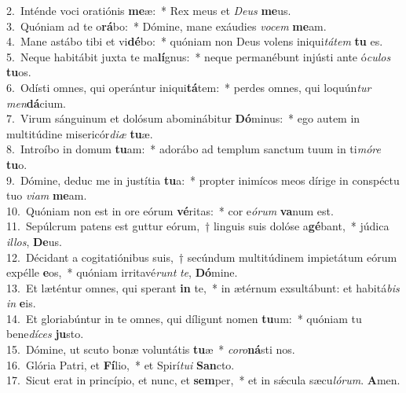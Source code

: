 {2.~}Inténde voci oratiónis \textbf{me}æ:~* Rex meus et \textit{De}\textit{us} \textbf{me}us.\\
{3.~}Quóniam ad te o\textbf{rá}bo:~* Dómine, mane exáudies \textit{vo}\textit{cem} \textbf{me}am.\\
{4.~}Mane astábo tibi et vi\textbf{dé}bo:~* quóniam non Deus volens iniqui\textit{tá}\textit{tem} \textbf{tu} es.\\
{5.~}Neque habitábit juxta te ma\textbf{lí}gnus:~* neque permanébunt injústi ante ó\textit{cu}\textit{los} \textbf{tu}os.\\
{6.~}Odísti omnes, qui operántur iniqui\textbf{tá}tem:~* perdes omnes, qui loquún\textit{tur} \textit{men}\textbf{dá}cium.\\
{7.~}Virum sánguinum et dolósum abominábitur \textbf{Dó}minus:~* ego autem in multitúdine misericór\textit{di}\textit{æ} \textbf{tu}æ.\\
{8.~}Introíbo in domum \textbf{tu}am:~* adorábo ad templum sanctum tuum in ti\textit{mó}\textit{re} \textbf{tu}o.\\
{9.~}Dómine, deduc me in justítia \textbf{tu}a:~* propter inimícos meos dírige in conspéctu tuo \textit{vi}\textit{am} \textbf{me}am.\\
{10.~}Quóniam non est in ore eórum \textbf{vé}ritas:~* cor e\textit{ó}\textit{rum} \textbf{va}num est.\\
{11.~}Sepúlcrum patens est guttur eórum,~† linguis suis dolóse a\textbf{gé}bant,~* júdica \textit{il}\textit{los}, \textbf{De}us.\\
{12.~}Décidant a cogitatiónibus suis,~† secúndum multitúdinem impietátum eórum expélle \textbf{e}os,~* quóniam irritavé\textit{runt} \textit{te}, \textbf{Dó}mine.\\
{13.~}Et læténtur omnes, qui sperant \textbf{in} te,~* in ætérnum exsultábunt: et habitá\textit{bis} \textit{in} \textbf{e}is.\\
{14.~}Et gloriabúntur in te omnes, qui díligunt nomen \textbf{tu}um:~* quóniam tu bene\textit{dí}\textit{ces} \textbf{ju}sto.\\
{15.~}Dómine, ut scuto bonæ voluntátis \textbf{tu}æ~* \textit{co}\textit{ro}\textbf{ná}sti nos.\\
{16.~}Glória Patri, et \textbf{Fí}lio,~* et Spirí\textit{tu}\textit{i} \textbf{San}cto.\\
{17.~}Sicut erat in princípio, et nunc, et \textbf{sem}per,~* et in sǽcula sæcu\textit{ló}\textit{rum}. \textbf{A}men.\\
